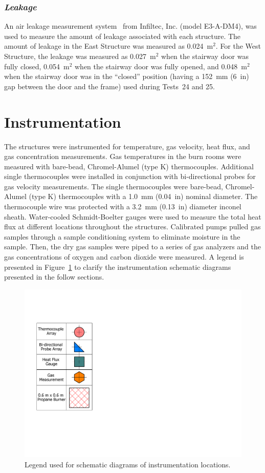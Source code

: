 \subsubsection*{\textit{Leakage}}
An air leakage measurement system~\cite{INFILTEC:leakage} from Infiltec, Inc. (model E3-A-DM4), was used to measure the amount of leakage associated with each structure. The amount of leakage in the East Structure was measured as 0.024~m$^2$. For the West Structure, the leakage was measured as 0.027~m$^2$ when the stairway door was fully closed, 0.054~m$^2$ when the stairway door was fully opened, and 0.048~m$^2$ when the stairway door was in the ``closed'' position (having a 152~mm (6~in) gap between the door and the frame) used during Tests~24 and 25.

\section{Instrumentation}
\label{sec:intrumentation}
The structures were instrumented for temperature, gas velocity, heat flux, and gas concentration measurements. Gas temperatures in the burn rooms were measured with bare-bead, Chromel-Alumel (type K) thermocouples. Additional single thermocouples were installed in conjunction with bi-directional probes for gas velocity measurements. The single thermocouples were bare-bead, Chromel-Alumel (type K) thermocouples with a 1.0~mm (0.04~in) nominal diameter. The thermocouple wire was protected with a 3.2~mm (0.13~in) diameter inconel sheath. Water-cooled Schmidt-Boelter gauges were used to measure the total heat flux at different locations throughout the structures. Calibrated pumps pulled gas samples through a sample conditioning system to eliminate moisture in the sample. Then, the dry gas samples were piped to a series of gas analyzers and the gas concentrations of oxygen and carbon dioxide were measured. A legend is presented in Figure~\ref{fig:Instrumentation_Legend} to clarify the instrumentation schematic diagrams presented in the follow sections.

\begin{figure}[!h]
	\centering
	\includegraphics[width=0.25\columnwidth]{Figures/Floor_Plans/Instrumentation_Legend}
	\caption[Instrumentation legend]{Legend used for schematic diagrams of instrumentation locations.}
	\label{fig:Instrumentation_Legend}
\end{figure}

